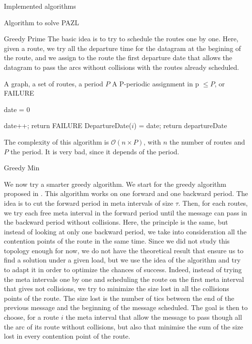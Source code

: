 \documentclass[10pt]{article}
\begin{document}
\begin{section}{Implemented algorithms}
\begin{subsection}{Algorithm to solve PAZL }
   
  \begin{subsubsection}{Greedy Prime}
  The basic idea is to try to schedule the routes one by one. Here, given a route, we try all the departure time for the datagram at the begining of the route, and we assign to the route the first departure date that allows the datagram to pass the arcs without collisions with the routes already scheduled.

   	\begin{algorithm}[H]
 	\caption{Greedy Prime}
 	\begin{algorithmic}
 	\REQUIRE A graph, a set of routes, a period $P$
	\ENSURE A P-periodic assignment in p $\leq P$, or FAILURE

	\STATE date = $0$
	
 	
 	\STATE date++;
	\STATE return FAILURE
	\ENDIF
 	\ENDWHILE
	\STATE DepartureDate($i$) = date;
 	\ENDFOR
	\STATE return departureDate
 	\end{algorithmic}
 	\end{algorithm}
 	The complexity of this algorithm is $\mathcal{O}(n\times P)$, with $n$ the number of routes and $P$ the period. It is very bad, since it depends of the period.
  \end{subsubsection}
    \begin{subsubsection}{Greedy Min}
  
  We now try a smarter greedy algorithm. We start for the greedy algorithm proposed in \cite{Guir1806:Deterministic}.
  This algorithm works on one forward and one backward period. The idea is to cut the forward period in meta intervals of size $\tau$. Then, for each routes, we try each free meta interval in the forward period until the message can pass in the backward period without collisions. Here, the principle is the same, but instead of looking at only one backward period, we take into consideration all the contention points of the route in the same time. Since we did not study this topology enough for now, we do not have the theoretical result that ensure us to find a solution under a given load, but we use the idea of the algorithm and try to adapt it in order to optimize the chances of success. Indeed, instead of trying the meta intervals one by one and scheduling the route on the first meta interval that gives not collisions, we try to minimize the size lost in all the collisions points of the route.
 	The size lost is the number of tics between the end of the previous message and the beginning of the message scheduled.
	The goal is then to choose, for a route $i$ the meta interval that allow the message to pass though all the arc of its route without collisions, but also that minimise the sum of the size lost in every contention point of the route.
	

\end{subsubsection}
\end{subsection}
\end{section}
\end{document}

